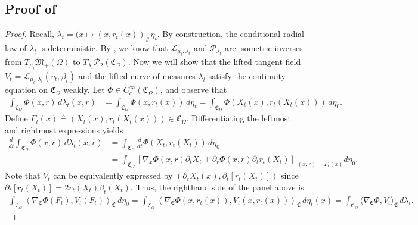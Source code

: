 \documentclass[11pt]{article}
\begin{document}
\subsection{Proof of } \label{sec: proof of lifting by characteristics two}

\begin{proof}
    Recall, $\lambda_t = (x \mapsto (x, r_t(x))_\# \eta_t$. By construction, the conditional radial law of $\lambda_t$ is deterministic. By , we know that $\mathcal{L}_{\mu_t, \lambda_t}$ and $\mathcal{P}_{\lambda_t}$ are isometric inverses from $T_{\mu_t}\mathfrak{M}_+(\Omega)$ to $T_{\lambda_t}\mathcal{P}_2(\mathfrak{C}_\Omega)$. Now we will show that the lifted tangent field $V_t = \mathcal{L}_{\mu_t, \lambda_t}(v_t, \beta_t)$ and the lifted curve of measures $\lambda_t$ satisfy the continuity equation on $\mathfrak{C}_\Omega$ weakly. Let $\Phi \in C^\infty_c(\mathfrak{C}_\Omega)$, and observe that  
    \begin{align*}
        \int_{\mathfrak{C}_\Omega}\Phi(x,r) \, d\lambda_t(x,r) &= \int_{\mathfrak{C}_\Omega} \Phi(x, r_t(x))\, d\eta_t = \int_{\mathfrak{C}_\Omega} \Phi\left(X_t(x), r_t\left(X_t(x)\right)\right) \, d\eta_0.
    \end{align*}
    Define $F_t(x) \triangleq (X_t(x), r_t(X_t(x))) \in \mathfrak{C}_\Omega$. Differentiating the leftmost and rightmost expressions yields
    \begin{align*}
        \frac{d}{dt}\int_{\mathfrak{C}_\Omega}\Phi(x,r) \, d\lambda_t(x,r) &=  \int_{\mathfrak{C}_\Omega} \frac{d}{dt}\Phi\left(X_t, r_t\left(X_t\right)\right) \, d\eta_0 \\
        &= \int_{\mathfrak{C}_\Omega} \left[\nabla_x\Phi(x,r) \partial_tX_t + \partial_r \Phi(x,r)\partial_tr_t(X_t)\right]\Big|_{(x,r) = F_t(x)} d\eta_0.
    \end{align*}
    Note that $V_t$ can be equivalently expressed by $(\partial_t X_t(x), \partial_t [r_t(X_t)])$ since $\partial_t[r_t(X_t)] = 2r_t(X_t)\beta_t(X_t)$. Thus, the righthand side of the panel above is 
    \begin{align*}
        \int_{\mathfrak{C}_\Omega} \left\langle \nabla_{\mathfrak{C}}\Phi(F_t), V_t(F_t)\right\rangle_{\mathfrak{C}} \,d\eta_0 = \int_{\mathfrak{C}_\Omega} \left\langle \nabla_{\mathfrak{C}}\Phi(x, r_t(x)), V_t(x, r_t(x))\right\rangle_{\mathfrak{C}} \,d\eta_t(x)
        = \int_{\mathfrak{C}_\Omega}\langle \nabla_{\mathfrak{C}}\Phi, V_t\rangle_{\mathfrak{C}} \, d\lambda_t.
    \end{align*}

\end{proof}
\end{document}

